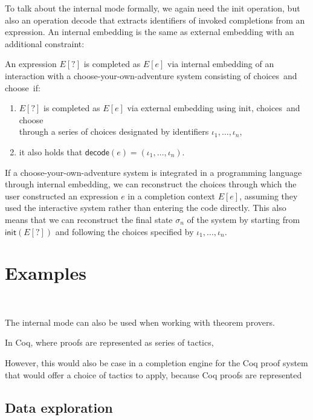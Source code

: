 \documentclass[a4paper,UKenglish,cleveref, autoref, thm-restate]{lipics-v2021}
\newcommand{\ident}[1]{\textsf{#1}}
\newcommand{\select}{\textnormal{\ident{choose}}}
\newcommand{\choices}{\textnormal{\ident{choices}}}
\begin{document}
To talk about the internal mode formally, we again need the \ident{init} operation, but also an
operation \ident{decode} that extracts identifiers of invoked completions from an expression.
An internal embedding is the same as external embedding with an additional constraint:

\begin{definition}\label{def:internal}
An expression $E[?]$ is completed as $E[e]$ via internal embedding of an interaction with
a choose-your-own-adventure system consisting of \choices\ and \select\ if:

\vspace{-0.25em}
\raggedright
\begin{enumerate}
\item $E[?]$ is completed as $E[e]$ via external embedding using \ident{init}, \choices\ and \select\\
  through a series of choices designated by identifiers $\iota_1, \ldots, \iota_n$,
\item it also holds that $\ident{decode}(e)=(\iota_1, \ldots, \iota_n)$.
\end{enumerate}
\end{definition}

If a choose-your-own-adventure system is integrated in a programming language
through internal embedding, we can reconstruct the choices through which the user constructed
an expression $e$ in a completion context $E[e]$, assuming they used the interactive system rather
than entering the code directly. This also means that we can reconstruct the final state $\sigma_n$
of the system by starting from $\ident{init}(E[?])$ and following the choices specified by
$\iota_1, \ldots, \iota_n$.


\section{Examples}
\label{sec:examples}

~

The internal mode can also be used when
working with theorem provers.

In Coq, where proofs are represented as series of tactics,

However, this would also be case in a
completion engine for the Coq proof system that would offer a choice of tactics to apply, because
Coq proofs are represented


\subsection{Data exploration}
\end{document}
